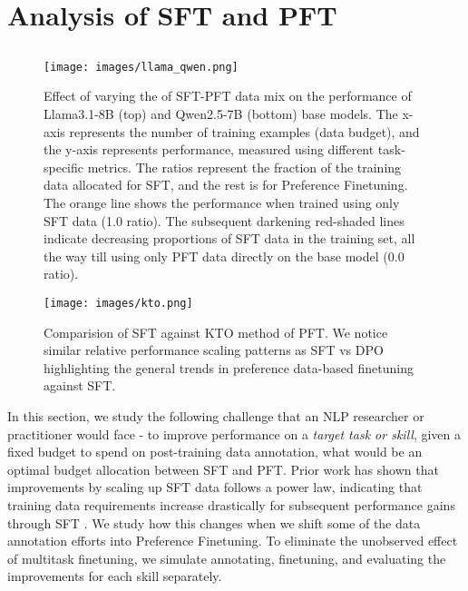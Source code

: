 \section{Analysis of SFT and PFT}

\subsection{\RQOne}

\label{optimal_ratio}

\begin{figure*}[!h]
    \centering
    \texttt{[image: images/llama\_qwen.png]}
    
    \caption{Effect of varying the of SFT-PFT data mix on the performance of Llama3.1-8B (top) and Qwen2.5-7B (bottom) base models. The x-axis represents the number of training examples (data budget), and the y-axis represents performance, measured using different task-specific metrics. The ratios represent the fraction of the training data allocated for SFT, and the rest is for Preference Finetuning. The orange line shows the performance when trained using only SFT data (1.0 ratio). The subsequent darkening red-shaded lines indicate decreasing proportions of SFT data in the training set, all the way till using only PFT data directly on the base model (0.0 ratio).}
    \label{fig:llama_qwen}
\end{figure*}

\begin{figure}
    \centering
    \texttt{[image: images/kto.png]}
    \caption{Comparision of SFT against KTO method of PFT. We notice similar relative performance scaling patterns as SFT vs DPO highlighting the general trends in preference data-based finetuning against SFT.}
    \label{fig:kto}
\end{figure}


In this section, we study the following challenge that an NLP researcher or practitioner would face - to improve performance on a \textit{target task or skill}, given a fixed budget to spend on post-training data annotation, what would be an optimal budget allocation between SFT and PFT. Prior work has shown that improvements by scaling up SFT data follows a power law, indicating that training data requirements increase drastically for subsequent performance gains through SFT \citep{raghavendra2024revisitingsuperficialalignmenthypothesis}. We study how this changes when we shift some of the data annotation efforts into Preference Finetuning. To eliminate the unobserved effect of multitask finetuning, we simulate annotating, finetuning, and evaluating the improvements for each skill separately. 

